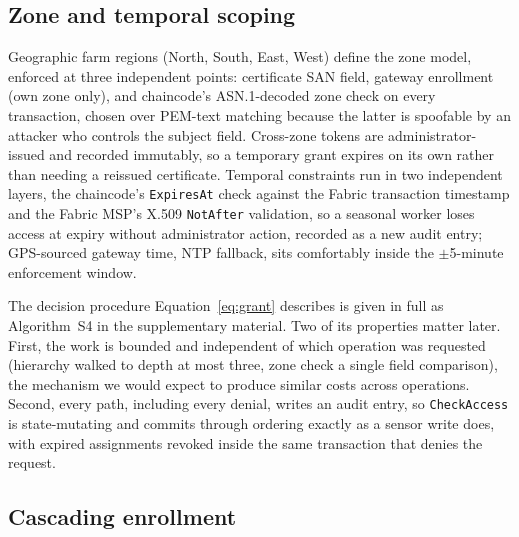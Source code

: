 \documentclass[a4paper,fleqn]{cas-dc}
\begin{document}
\subsection{Zone and temporal scoping}
\label{subsec:zones}

Geographic farm regions (North, South, East, West) define the zone model,
enforced at three independent points: certificate SAN field, gateway
enrollment (own zone only), and chaincode's ASN.1-decoded zone check on
every transaction, chosen over PEM-text matching because the latter is
spoofable by an attacker who controls the subject field. Cross-zone
tokens are administrator-issued and recorded immutably, so a temporary
grant expires on its own rather than needing a reissued certificate.
Temporal constraints run in two independent layers, the chaincode's
\texttt{ExpiresAt} check against the Fabric transaction timestamp and the
Fabric MSP's X.509 \texttt{NotAfter} validation, so a seasonal worker
loses access at expiry without administrator action, recorded as a new
audit entry; GPS-sourced gateway time, NTP fallback, sits comfortably
inside the $\pm$5-minute enforcement window.

The decision procedure Equation~\eqref{eq:grant} describes is given in
full as Algorithm~S4 in the supplementary material. Two of its properties
matter later. First, the work is bounded and independent of which
operation was requested (hierarchy walked to depth at most three, zone
check a single field comparison), the mechanism we would expect to produce
similar costs across operations. Second, every path, including every
denial, writes an audit entry, so \texttt{CheckAccess} is state-mutating
and commits through ordering exactly as a sensor write does, with expired
assignments revoked inside the same transaction that denies the request.

\subsection{Cascading enrollment}
\label{subsec:enrollment}
\end{document}
